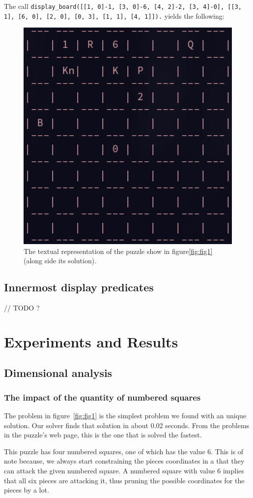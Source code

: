 \documentclass[runningheads]{llncs}
\newcommand{\inlinecode}[1]{\texttt{#1}}
\begin{document}
The call \inlinecode{display\_board([[1, 0]-1, [3, 0]-6, [4, 2]-2, [3, 4]-0],
[[3, 1], [6, 0], [2, 0], [0, 3], [1, 1], [4, 1]]).} yields the following:
\begin{figure}[H]
\includegraphics[width=0.5\linewidth]{figures/display_board_2.png}
  \centering
  \caption{The textual representation of the puzzle show in figure\ref{fig:fig1}
  (along side its solution).}\label{fig:fig3}
\end{figure}

\subsection{Innermost display predicates}

// TODO ?

\section{Experiments and Results}
\subsection{Dimensional analysis}
\subsubsection{The impact of the quantity of numbered squares}
The problem in figure~\ref{fig:fig1} is the simplest problem we found with
an unique solution. Our solver finds that solution in about 0.02 seconds.
From the problems in the puzzle's web page, this is the one that is solved
the fastest.

This puzzle has four numbered squares, one of which has the value 6. This
is of note because, we always start constraining the pieces coordinates
in a that they can attack the given numbered square. A numbered square with
value 6 implies that all six pieces are attacking it, thus pruning the
possible coordinates for the pieces by a lot.
\end{document}
